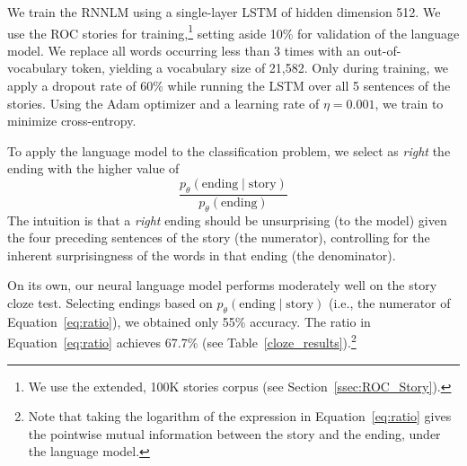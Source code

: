 \documentclass[11pt,a4paper]{article}
\newcommand{\secref}[1]{Section~\ref{ssec:#1}}
\newcommand{\tabref}[1]{Table~\ref{#1}}
\newcommand{\resolved}[1]{}
\newcommand{\roy}[1]{{\color{orange}\textsc{[#1 --rs]}}}
\newcommand{\nascomment}[1]{{\color{blue}\textsc{[#1 --nas]}}}
\renewcommand{\roy}[1]{{\color{orange}[#1 --rs]}}
\renewcommand{\roy}[1]{#1}
\renewcommand{\nascomment}[1]{}
\begin{document}
We train the RNNLM using a single-layer LSTM of hidden dimension 512.
We use the ROC stories for training,\footnote{We use the extended, 100K stories corpus (see \secref{ROC_Story}).} setting aside 10\% for validation of the language model. 
We replace all words occurring less than 3 times with an 
out-of-vocabulary token, yielding a vocabulary size of  21,582.
Only during training, we apply a dropout rate of 60\% while running the LSTM over all 5 sentences of the stories. 
Using the Adam optimizer \cite{kingma2014adam} and a learning rate of
$\eta=0.001$, we train to minimize cross-entropy. %

To apply the language model to the classification problem, we select
as \emph{right} the ending with the higher value of
\begin{equation}
\frac{p_\theta(\textrm{ending} \mid
  \textrm{story})}{p_\theta(\textrm{ending})} \label{eq:ratio}
\end{equation}
The intuition is that a \emph{right} ending should be unsurprising (to
the model)
given the four preceding sentences of the story (the numerator), controlling for the
inherent surprisingness of the words in that ending (the denominator).

\resolved{\nascomment{please check the paragraph above.  we need to say how we
  use the LM before we evaluate it!  also, has anyone tried an approach like this
  before?  even if we aren't exactly replicating another paper, if
  someone else used RNNs for this task, we should credit them.}
  \roy{Ours is the first work to publish LSTM results on this dataset.}}

On its own, our neural language model performs moderately well on the story cloze test. 
Selecting endings based on $p_\theta(\textrm{ending} \mid \textrm{story})$ (i.e., the numerator of
Equation~\ref{eq:ratio}), we obtained only 55\% accuracy.   The ratio
in Equation~\ref{eq:ratio} achieves 67.7\%  (see
\tabref{cloze_results}).\footnote{Note that taking the logarithm of
  the expression in Equation~\ref{eq:ratio} gives the pointwise mutual
information between the story and the ending, under the language
model.\nascomment{added this to replace the hedging that was here before}\resolved{\roy{We actually also use the RNNLM features in log space. Add that in the next paragraph.}}}
\end{document}

